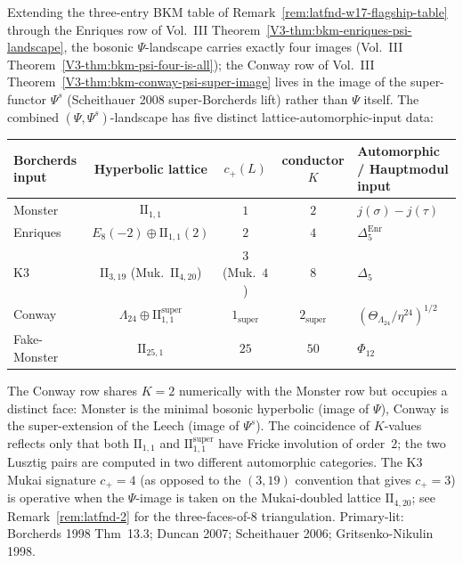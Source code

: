 \begin{remark}
\label{rem:latfnd-witten-five-entry-psi}
Extending the three-entry BKM table of
Remark~\ref{rem:latfnd-w17-flagship-table} through the Enriques
row of Vol.~III
Theorem~\ref{V3-thm:bkm-enriques-psi-landscape}, the bosonic
$\Psi$-landscape carries exactly four images
(Vol.~III Theorem~\ref{V3-thm:bkm-psi-four-is-all}); the Conway row
of Vol.~III Theorem~\ref{V3-thm:bkm-conway-psi-super-image} lives in
the image of the super-functor $\Psi^{s}$ (Scheithauer 2008
super-Borcherds lift) rather than $\Psi$ itself. The combined
$(\Psi,\Psi^{s})$-landscape has five distinct
lattice-automorphic-input data:
\begin{center}
\renewcommand{\arraystretch}{1.3}
\begin{tabular}{@{}lcccl@{}}
\toprule
Borcherds input & Hyperbolic lattice & $c_+(L)$ & conductor $K$ & Automorphic / Hauptmodul input \\
\midrule
Monster & $\mathrm{II}_{1,1}$ & $1$ & $2$ & $j(\sigma)-j(\tau)$ \\
Enriques & $E_8(-2)\oplus\mathrm{II}_{1,1}(2)$ & $2$ & $4$ & $\Delta_5^{\mathrm{Enr}}$ \\
K3 & $\mathrm{II}_{3,19}$ (Muk.\ $\mathrm{II}_{4,20}$) & $3$ (Muk.\ $4$) & $8$ & $\Delta_5$ \\
Conway & $\Lambda_{24}\oplus\mathrm{II}_{1,1}^{\mathrm{super}}$ & $1_{\mathrm{super}}$ & $2_{\mathrm{super}}$ & $(\Theta_{\Lambda_{24}}/\eta^{24})^{1/2}$ \\
Fake-Monster & $\mathrm{II}_{25,1}$ & $25$ & $50$ & $\Phi_{12}$ \\
\bottomrule
\end{tabular}
\end{center}
The Conway row shares $K = 2$ numerically with the Monster row
but occupies a distinct face: Monster is the minimal bosonic
hyperbolic (image of $\Psi$), Conway is the super-extension of
the Leech (image of $\Psi^{s}$). The coincidence of $K$-values
reflects only that both $\mathrm{II}_{1,1}$ and
$\mathrm{II}_{1,1}^{\mathrm{super}}$ have Fricke involution of
order~$2$; the two Lusztig pairs are computed in two different
automorphic categories.
The K3 Mukai signature $c_+ = 4$ (as opposed to the
$(3,19)$ convention that gives $c_+ = 3$) is operative when
the $\Psi$-image is taken on the Mukai-doubled lattice
$\mathrm{II}_{4,20}$; see
Remark~\ref{rem:latfnd-2} for the three-faces-of-$8$
triangulation. Primary-lit: Borcherds 1998 Thm~13.3;
Duncan 2007; Scheithauer 2006; Gritsenko-Nikulin 1998.
\end{remark}


